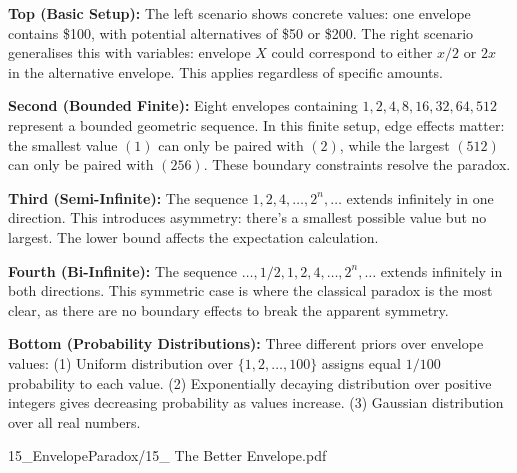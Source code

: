 \begin{SideNotePage}{
  \textbf{Top (Basic Setup):} The left scenario shows concrete values: one envelope contains \$100, with potential alternatives of \$50 or \$200. The right scenario generalises this with variables: envelope $X$ could correspond to either $x/2$ or $2x$ in the alternative envelope. This applies regardless of specific amounts. \par

  \textbf{Second (Bounded Finite):} Eight envelopes containing $1, 2, 4, 8, 16, 32, 64, 512$ represent a bounded geometric sequence. In this finite setup, edge effects matter: the smallest value $(1)$ can only be paired with $(2)$, while the largest $(512)$ can only be paired with $(256)$. These boundary constraints resolve the paradox. \par

  \textbf{Third (Semi-Infinite):} The sequence $1, 2, 4, \ldots, 2^n, \ldots$ extends infinitely in one direction. This introduces asymmetry: there's a smallest possible value but no largest. The lower bound affects the expectation calculation. \par

  \textbf{Fourth (Bi-Infinite):} The sequence $\ldots, 1/2, 1, 2, 4, \ldots, 2^n, \ldots$ extends infinitely in both directions. This symmetric case is where the classical paradox is the most clear, as there are no boundary effects to break the apparent symmetry. \par

  \textbf{Bottom (Probability Distributions):} Three different priors over envelope values: (1) Uniform distribution over $\{1, 2, \ldots, 100\}$ assigns equal $1/100$ probability to each value. (2) Exponentially decaying distribution over positive integers gives decreasing probability as values increase. (3) Gaussian distribution over all real numbers. \par
}{15_EnvelopeParadox/15_ The Better Envelope.pdf}
\end{SideNotePage}
